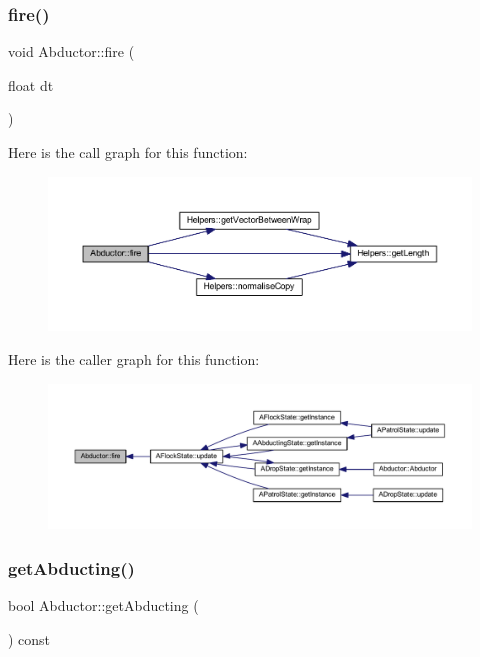 \subsubsection{\texorpdfstring{fire()}{fire()}}
{\footnotesize\ttfamily void Abductor\+::fire (\begin{DoxyParamCaption}\item[{float}]{dt }\end{DoxyParamCaption})}

Here is the call graph for this function\+:
\nopagebreak
\begin{figure}[H]
\begin{center}
\leavevmode
\includegraphics[width=350pt]{class_abductor_a12b84d9d38bec8ed3b495c5657903e50_cgraph}
\end{center}
\end{figure}
Here is the caller graph for this function\+:
\nopagebreak
\begin{figure}[H]
\begin{center}
\leavevmode
\includegraphics[width=350pt]{class_abductor_a12b84d9d38bec8ed3b495c5657903e50_icgraph}
\end{center}
\end{figure}
\mbox{\label{class_abductor_ac0c62963a2e8bdac8c34bfb2a2c0b868}} 
\subsubsection{\texorpdfstring{get\+Abducting()}{getAbducting()}}
{\footnotesize\ttfamily bool Abductor\+::get\+Abducting (\begin{DoxyParamCaption}{ }\end{DoxyParamCaption}) const}

